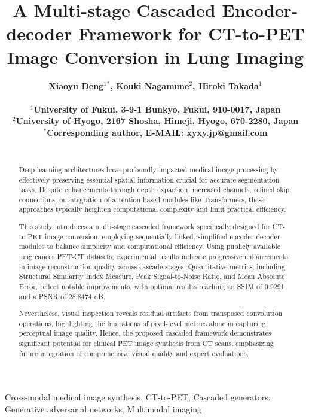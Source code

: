 \documentclass[a4paper, times, 10pt,twocolumn]{article}
\begin{document}
\title{A Multi-stage Cascaded Encoder-decoder Framework for CT-to-PET Image Conversion in Lung Imaging}  %

\author{\bf{\normalsize{Xiaoyu Deng${^1}{^*}$, Kouki Nagamune${^2}$, Hiroki Takada${^1}$}}\\ %
	\\
	\normalsize{$^1$University of Fukui, 3-9-1 Bunkyo, Fukui, 910-0017, Japan}\\
	\normalsize{$^2$University of Hyogo, 2167 Shosha, Himeji, Hyogo, 670-2280, Japan} \\
	\normalsize{$^*$Corresponding author, E-MAIL: xyxy.jp@gmail.com}\\
	\\}


\maketitle \thispagestyle{empty}

\begin{abstract}
	{
		Deep learning architectures have profoundly impacted medical image processing by effectively preserving essential spatial information crucial for accurate segmentation tasks. Despite enhancements through depth expansion, increased channels, refined skip connections, or integration of attention-based modules like Transformers, these approaches typically heighten computational complexity and limit practical efficiency.

		This study introduces a multi-stage cascaded framework specifically designed for CT-to-PET image conversion, employing sequentially linked, simplified encoder-decoder modules to balance simplicity and computational efficiency. Using publicly available lung cancer PET-CT datasets, experimental results indicate progressive enhancements in image reconstruction quality across cascade stages. Quantitative metrics, including Structural Similarity Index Measure, Peak Signal-to-Noise Ratio, and Mean Absolute Error, reflect notable improvements, with optimal results reaching an SSIM of 0.9291 and a PSNR of 28.8474 dB.

		Nevertheless, visual inspection reveals residual artifacts from transposed convolution operations, highlighting the limitations of pixel-level metrics alone in capturing perceptual image quality. Hence, the proposed cascaded framework demonstrates significant potential for clinical PET image synthesis from CT scans, emphasizing future integration of comprehensive visual quality and expert evaluations.
	}
\end{abstract}
\begin{keywords}
	{Cross-modal medical image synthesis, CT-to-PET, Cascaded generators, Generative adversarial networks, Multimodal imaging}
\end{keywords}
\end{document}
